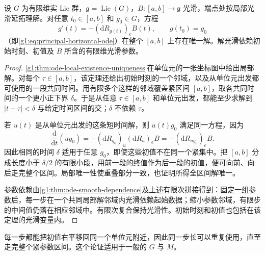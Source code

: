 \begin{lemma}\label{g1:lem:right-invariant-time-ode}
	设 \(G\) 为有限维实 Lie 群，\(\mathfrak g=\operatorname{Lie}(G)\)，\(B:[a,b]\to\mathfrak g\) 光滑，端点处按局部光滑延拓理解。对任意 \(t_0\in[a,b]\) 和 \(g_0\in G\)，方程
	\[
		g'(t)=-(\mathrm{d}R_{g(t)})_eB(t),\qquad g(t_0)=g_0
	\]
	（即\eqref{g1:eq:principal-horizontal-ode}）在整个 \([a,b]\) 上存在唯一解。解光滑依赖初始时刻、初值及 \(B\) 所含的有限维光滑参数。
\end{lemma}
\begin{proof}
	\cref{g1:thm:ode-local-existence-uniqueness}在单位元的一张坐标图中给出局部解。对每个 \(\tau\in[a,b]\)，该定理还给出初始时刻的一个邻域，以及从单位元出发都可使用的一段共同时间。用有限多个这样的邻域覆盖紧区间 \([a,b]\)，取各共同时间的一个更小正下界 \(\delta\)。于是从任意 \(\tau\in[a,b]\) 和单位元出发，都能至少求解到 \(|t-\tau|<\delta\) 与给定时间区间的交；\(\delta\) 不依赖 \(\tau\)。

	若 \(u(t)\) 是从单位元出发的这条短时间解，则 \(u(t)g_0\) 满足同一方程，因为
	\[
		\frac{\mathrm{d}}{\mathrm{d}t}(u g_0)
		=-(\mathrm{d}R_{g_0})_u(\mathrm{d}R_u)_eB
		=-(\mathrm{d}R_{u g_0})_eB.
	\]
	因此相同的时间 \(\delta\) 适用于任意 \(g_0\)，即使这些初值不在同一个紧集中。把 \([a,b]\) 分成长度小于 \(\delta/2\) 的有限小段，用前一段的终值作为后一段的初值，便可向前、向后走完整个区间。局部唯一性使重叠部分一致，也证明所得全区间解唯一。

	参数依赖由\cref{g1:thm:ode-smooth-dependence}及上述有限次拼接得到：固定一组参数后，每一步在一个共同局部解邻域内光滑依赖起始数据；缩小参数邻域，有限步的中间值仍落在相应邻域中。有限次复合保持光滑性。初始时刻和初值也包括在该定理的光滑变量内。
\end{proof}

每一步都能把初值右平移回同一个单位元附近，因此同一步长可以重复使用，直至走完整个紧参数区间。这个论证适用于一般的 \(G\) 与 \(M\)。

